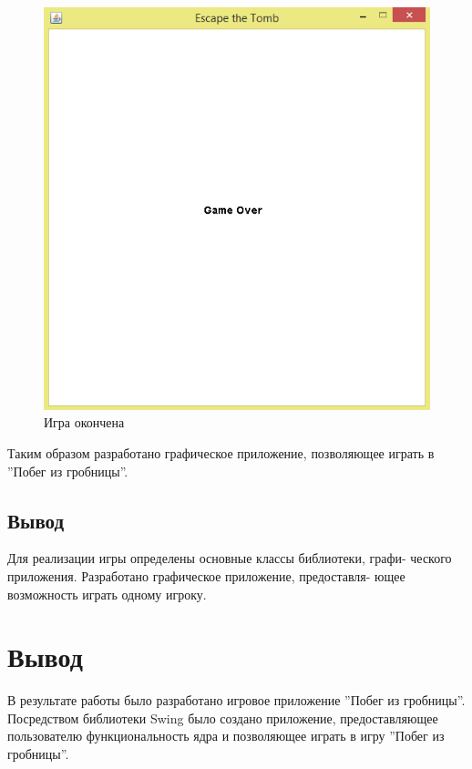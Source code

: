 \documentclass[a4paper]{article}
\begin{document}
\begin{figure}[H]
	\begin{center}
		\includegraphics[scale=0.7]{image/gameover.png}
		\caption{Игра окончена} 
		\label{pic:pic_name} %
	\end{center}
\end{figure}

Таким образом разработано графическое приложение, позволяющее играть в ''Побег из гробницы''.\\

\subsection{Вывод}

Для реализации игры определены основные классы библиотеки, графи-
ческого приложения. Разработано графическое приложение, предоставля-
ющее возможность играть одному игроку.\\



\section{Вывод}

В результате работы было разработано игровое приложение ''Побег из гробницы''. Посредством библиотеки Swing было создано приложение, предоставляющее пользователю функциональность
ядра и позволяющее играть в игру ''Побег из гробницы''.
\end{document}
